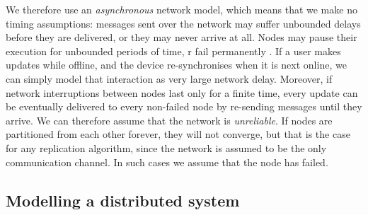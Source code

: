 We therefore use an \emph{asynchronous} network model, which means that we make no timing assumptions: messages sent over the network may suffer unbounded delays before they are delivered, or they may never arrive at all. 
Nodes may pause their execution for unbounded periods of time, r fail permanently \cite{Cachin:2011wt}. 
If a user makes updates while offline, and the device re-synchronises when it is next online, we can simply model that interaction as very large network delay.
Moreover, if network interruptions between nodes last only for a finite time, every update can be eventually delivered to every non-failed node by re-sending messages until they arrive.
We can therefore assume that the network is \emph{unreliable}.
If nodes are partitioned from each other forever, they will not converge, but that is the case for any replication algorithm, since the network is assumed to be the only communication channel.
In such cases we assume that the node has failed.


\subsection{Modelling a distributed system}

